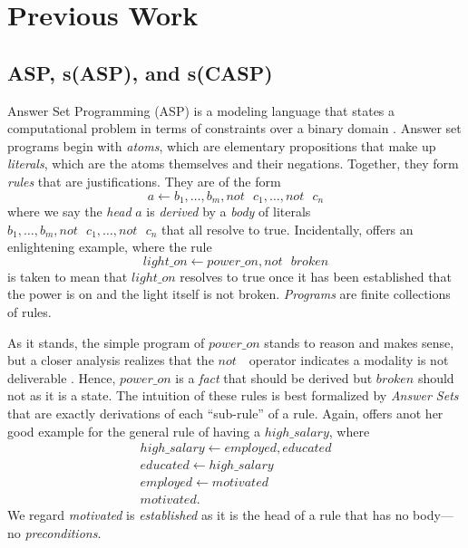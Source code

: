 \documentclass[11pt]{article}
\begin{document}
\section{Previous Work}
\subsection{ASP, s(ASP), and s(CASP)}
\label{subsec:asp}
Answer Set Programming (ASP) is a modeling language that states a computational problem in terms of constraints over a binary domain \cite{10.1145/2043174.2043195}. Answer set programs begin with \textit{atoms}, which are elementary propositions that make up \textit{literals}, which are the atoms themselves and their negations. Together, they form \textit{rules} that are justifications. They are of the form $$a \leftarrow b_1,\dots, b_m, not \text{ } c_1,\dots,not \text{ } c_n$$ where we say the \textit{head} $a$ is \textit{derived} by a \textit{body} of literals $b_1,\dots, b_m, not \text{ } c_1,\dots,not \text{ } c_n$ that all resolve to true. Incidentally, \cite{10.1145/2043174.2043195} offers an enlightening example, where the rule $$light\_on \leftarrow power\_on, not \text{ } broken$$ is taken to mean that $light\_on$  resolves to true once it has been established that the power is on and the light itself is not \text{ } broken.  \textit{Programs} are finite collections of rules. 

As it stands, the simple program of $power\_on$ stands to reason and makes sense, but a closer analysis realizes that the $not \text{ }$ operator indicates a modality is not \text{ } deliverable \cite{10.1145/2043174.2043195}. Hence, $power\_on$ is a \textit{fact} that should be derived but $broken$ should not \text{ } as it is a state. The intuition of these rules is best formalized by \textit{Answer Sets} that are exactly derivations of each ``sub-rule'' of a rule. Again, \cite{10.1145/2043174.2043195} offers anot \text{ }her good example for the general rule of having a $high\_salary$, where
\begin{equation*}
    \begin{align*}
        high\_salary \leftarrow employed, educated \\
        educated \leftarrow high\_salary\\
        employed \leftarrow motivated\\
        motivated.
    \end{align*}
\end{equation*}
We regard \textit{motivated} is \textit{established} as it is the head of a rule that has no body—no \textit{preconditions}.
\end{document}
